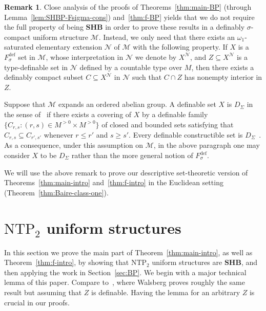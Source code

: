 \documentclass[12pt]{article}
\newcommand{\Mm}{\mathcal{M}}
\newcommand{\Nn}{\mathcal{N}}
\newcommand{\dF}{\ensuremath{F_\sigma^{\text{def}}}}
\newcommand{\BP}{\textbf{SHB}}
\newcommand{\R}{\mathbb{R}}
\newcommand{\NTP}{\ensuremath{\mathrm{NTP}_2}}
\theoremstyle{definition}
\newtheorem{remark}[theorem]{Remark}
\theoremstyle{remark}
\begin{document}
\begin{remark}\label{rem:simple-BP}
Close analysis of the proofs of Theorems~\ref{thm:main-BP} (through Lemma~\ref{lem:SHBP-Fsigma-cons}) and~\ref{thm:f-BP} yields that we do not require the full property of being $\BP$ in order to prove these results in a definably $\sigma$-compact uniform structure $\Mm$. Instead, we only need that there exists an $\omega_1$-saturated elementary extension $\Nn$ of $\Mm$ with the following property. If $X$ is a $\dF$ set in $\Mm$, whose interpretation in $\Nn$ we denote by $X^{\Nn}$, and $Z\subseteq X^{\Nn}$ is a type-definable set in $\Nn$ defined by a countable type over $M$, then there exists a definably compact subset $C\subseteq X^{\Nn}$ in $\Nn$ such that $C\cap Z$ has nonempty interior in $Z$.  

Suppose that $\Mm$ expands an ordered abelian group. A definable set $X$ is $D_\Sigma$ in the sense of~\cite{DMS10} if there exists a covering of $X$ by a definable family $\{C_{r,s} : (r,s)\in M^{>0}\times M^{>0}\}$ of closed and bounded sets satisfying that $C_{r,s}\subseteq C_{r',s'}$ whenever $r\leq r'$ and $s\geq s'$. Every definable constructible set is $D_\Sigma$~\cite[1.10]{DMS10}. As a consequence, under this assumption on $\Mm$, in the above paragraph one may consider $X$ to be $D_\Sigma$ rather than the more general notion of $\dF$.
\end{remark}

We will use the above remark to prove our descriptive set-theoretic version of Theorems~\ref{thm:main-intro} and~\ref{thm:f-intro} in the Euclidean setting (Theorem~\ref{thm:Baire-class-one}).

\section{\NTP{} uniform structures} \label{sec:ntp}

In this section we prove the main part of Theorem~\ref{thm:main-intro}, as well as Theorem~\ref{thm:f-intro}, by showing that $\NTP$ uniform structures are $\BP$, and then applying the work in Section~\ref{sec:BP}. We begin with a major technical lemma of this paper. Compare to~\cite[Theorem 4.1]{Wal22}, where Walsberg proves roughly the same result but assuming that $Z$ is definable. Having the lemma for an arbitrary $Z$ is crucial in our proofs. 
\end{document}
